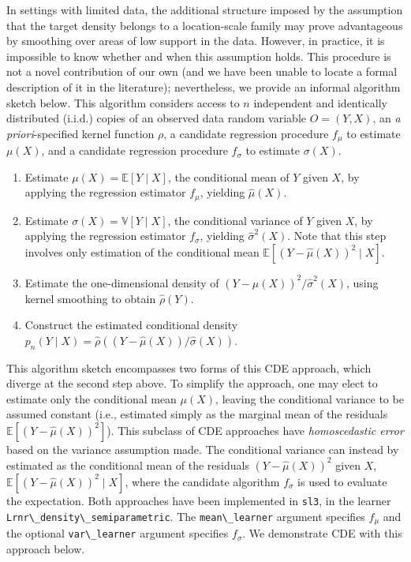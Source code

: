 \documentclass[
  12pt, krantz2,
]{krantz}
\newcommand{\passthrough}[1]{#1}
\providecommand{\tightlist}{%
  \setlength{\itemsep}{0pt}\setlength{\parskip}{0pt}}
\newcommand{\E}{\mathbb{E}}
\newcommand{\1}{\mathbbm{1}}
\theoremstyle{definition}
\theoremstyle{definition}
\theoremstyle{definition}
\theoremstyle{definition}
\theoremstyle{remark}
\begin{document}
In settings with limited data, the additional structure imposed by the
assumption that the target density belongs to a location-scale family may prove
advantageous by smoothing over areas of low support in the data. However, in
practice, it is impossible to know whether and when this assumption holds. This
procedure is not a novel contribution of our own (and we have been unable to
locate a formal description of it in the literature); nevertheless, we provide
an informal algorithm sketch below. This algorithm considers access to \(n\)
independent and identically distributed (i.i.d.) copies of an observed data
random variable \(O = (Y, X)\), an \emph{a priori}-specified kernel function \(\rho\), a
candidate regression procedure \(f_{\mu}\) to estimate \(\mu(X)\), and a candidate
regression procedure \(f_{\sigma}\) to estimate \(\sigma(X)\).

\begin{enumerate}
\def\labelenumi{\arabic{enumi}.}
\tightlist
\item
  Estimate \(\mu(X) = \E[Y \mid X]\), the conditional mean of \(Y\) given \(X\), by
  applying the regression estimator \(f_{\mu}\), yielding \(\hat{\mu}(X)\).
\item
  Estimate \(\sigma(X) = \mathbb{V}[Y \mid X]\), the conditional variance of \(Y\)
  given \(X\), by applying the regression estimator \(f_{\sigma}\), yielding
  \(\hat{\sigma}^2(X)\). Note that this step involves only estimation of the
  conditional mean \(\E[(Y - \hat{\mu}(X))^2 \mid X]\).
\item
  Estimate the one-dimensional density of \((Y - \hat{\mu}(X))^2 / \hat{\sigma}^2(X)\), using kernel smoothing to obtain \(\hat{\rho}(Y)\).
\item
  Construct the estimated conditional density \(p_n(Y \mid X) = \hat{\rho}((Y - \hat{\mu}(X)) / \hat{\sigma}(X))\).
\end{enumerate}

This algorithm sketch encompasses two forms of this CDE approach, which diverge
at the second step above. To simplify the approach, one may elect to estimate
only the conditional mean \(\mu(X)\), leaving the conditional variance to be
assumed constant (i.e., estimated simply as the marginal mean of the residuals
\(\E[(Y - \hat{\mu}(X))^2]\)). This subclass of CDE approaches have \emph{homoscedastic
error} based on the variance assumption made. The conditional variance can
instead by estimated as the conditional mean of the residuals \((Y - \hat{\mu}(X))^2\) given \(X\), \(\E[(Y - \hat{\mu}(X))^2 \mid X]\), where the
candidate algorithm \(f_{\sigma}\) is used to evaluate the expectation. Both
approaches have been implemented in \passthrough{\lstinline!sl3!}, in the learner
\passthrough{\lstinline!Lrnr\_density\_semiparametric!}. The \passthrough{\lstinline!mean\_learner!} argument specifies \(f_{\mu}\)
and the optional \passthrough{\lstinline!var\_learner!} argument specifies \(f_{\sigma}\). We demonstrate
CDE with this approach below.
\end{document}
